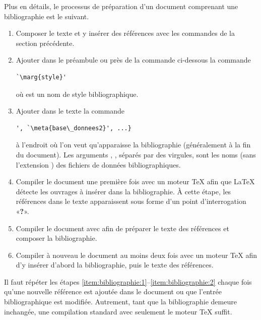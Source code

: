 Plus en détails, le processus de préparation d'un document comprenant
une bibliographie est le suivant.

\begin{enumerate}
\item Composer le texte et y insérer des références avec les commandes
  de la section précédente.
\item Ajouter dans le préambule ou près de la commande
  \cmdprint{} ci-dessous la commande
\begin{lstlisting}
`\marg{style}'
\end{lstlisting}
  où  est un nom de style bibliographique.
\item Ajouter dans le texte la commande
\begin{lstlisting}
', `\meta{base\_donnees2}', ...}
\end{lstlisting}
  à l'endroit où l'on veut qu'apparaisse la bibliographie
  (généralement à la fin du document). Les arguments
  , , séparés par des
  virgules, sont les noms (sans l'extension ) des fichiers
  de données bibliographiques.
\item \label{item:bibliographie:1} Compiler le document une première
  fois avec un moteur {\TeX} afin que {\LaTeX} détecte les ouvrages à
  insérer dans la bibliographie. À cette étape, les références dans le
  texte apparaissent sous forme d'un point d'interrogation
  «\textbf{?}».
\item Compiler le document avec {\BibTeX} afin de préparer le texte
  des références et composer la bibliographie.
\item \label{item:bibliographie:2} Compiler à nouveau le document au
  moins deux fois avec un moteur {\TeX} afin d'y insérer d'abord la
  bibliographie, puis le texte des références.
\end{enumerate}

Il faut répéter les étapes
\ref*{item:bibliographie:1}--\ref*{item:bibliographie:2} chaque fois
qu'une nouvelle référence est ajoutée dans le document ou que l'entrée
bibliographique est modifiée. Autrement, tant que la bibliographie
demeure inchangée, une compilation standard avec seulement le moteur
{\TeX} suffit.

